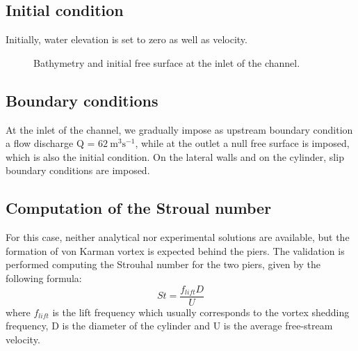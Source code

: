 \subsection{Initial condition}

Initially, water elevation is set to zero as well as velocity.

\begin{figure}[H]
 \centering
 \caption{Bathymetry and initial free surface at the inlet of the channel.}
 \label{fig:init:bridge}
\end{figure}

\subsection{Boundary conditions}

At the inlet of the channel, we gradually impose as upstream boundary condition a flow discharge Q = $62~\text{m}^3\text{s}^{-1}$,
while at the outlet a null free surface is imposed, which is also the initial condition. On the lateral walls and on the cylinder, slip boundary conditions are imposed.

\subsection{Computation of the Stroual number}

For this case, neither analytical nor experimental solutions are available, but the formation of von Karman vortex is expected behind the piers. The validation is performed computing the Strouhal number for the two piers, given by the following formula:
\begin{equation*}
St=\frac{f_{lift}D}{U}
\end{equation*}
where $f_{lift}$ is the lift frequency which usually corresponds to the vortex shedding frequency, D is the diameter of the cylinder and U is the average free-stream velocity.

